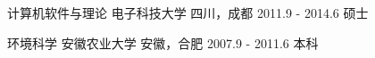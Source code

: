 

\begin{cventries}

  \cveduentry
    {计算机软件与理论} %
    {电子科技大学} %
    {四川，成都} %
    {2011.9 - 2014.6} %
    {硕士}

  \cveduentry
    {环境科学} %
    {安徽农业大学} %
    {安徽，合肥} %
    {2007.9 - 2011.6} %
    {本科}

\end{cventries}
